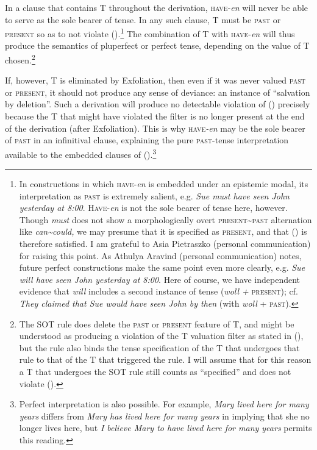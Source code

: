 \documentclass[output=paper]{langscibook}
\begin{document}
\noindent  In a clause that contains T throughout the derivation, \textsc{have}-\textit{en} will never be able to serve as the sole bearer of tense. In any such clause, T must be \textsc{past }or \textsc{present} so as to not violate \noindent ().\footnote{In constructions in which \textsc{have}-\textit{en }is embedded under an epistemic modal, its interpretation as \textsc{past }is extremely salient, e.g. \textit{Sue must have seen John} \textit{yesterday at 8:00}. \textsc{Have-}\textit{en} is not the sole bearer of tense here, however. Though \textit{must} does not show a morphologically overt \textsc{present\textasciitilde past }alternation like \textit{can\textasciitilde could, }we may presume that it is specified as \textsc{present}, and that () is therefore satisfied. I am grateful to Asia Pietraszko (personal communication) for raising this point. As Athulya Aravind (personal communication) notes, future perfect constructions make the same point even more clearly, e.g. \textit{Sue will have seen John yesterday at 8:00}. Here of course, we have independent evidence that \textit{will} includes a second instance of tense (\textit{woll + }\textsc{present}); cf. \textit{They claimed that Sue would have seen John by then }(with \textit{woll }+ \textsc{past}).} The combination of T with \textsc{have-}\textit{en}\textsc{ }will thus produce the semantics of pluperfect or perfect tense, depending on the value of T chosen.\footnote{The SOT rule does delete the \textsc{past }or \textsc{present }feature of T, and might be understood as producing a violation of the T valuation filter as stated in (), but the rule also binds the tense specification of the T that undergoes that rule to that of the T that triggered the rule. I will assume that for this reason a T that undergoes the SOT rule still counts as “specified” and does not violate ().}

If, however, T is eliminated by Exfoliation, then even if it was never valued \textsc{past }or \textsc{present}, it should not produce any sense of deviance: an instance of “salvation by deletion”. Such a derivation will produce no detectable violation of () precisely because the T that might have violated the filter is no longer present at the end of the derivation (after Exfoliation). This is why \textsc{have}\textit{-en }may be the sole bearer of \textsc{past }in an infinitival clause, explaining the pure \textsc{past}-tense interpretation available to the embedded clauses of ().\footnote{Perfect interpretation is also possible. For example, \textit{Mary lived here for many years} differs from \textit{Mary has lived here for many years} in implying that she no longer lives here, but \textit{I believe Mary to have lived here for many years} permits this reading.} 
\end{document}
